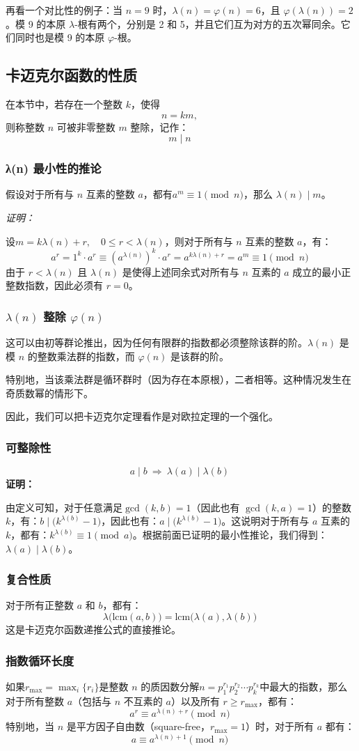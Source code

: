 再看一个对比性的例子：当 $n = 9$ 时，$\lambda(n) = \varphi(n) = 6$，且 $\varphi(\lambda(n)) = 2$。模 9 的本原 $\lambda$-根有两个，分别是 2 和 5，并且它们互为对方的五次幂同余。它们同时也是模 9 的本原 $\varphi$-根。
\subsection{卡迈克尔函数的性质}
在本节中，若存在一个整数 $k$，使得
$$
n = k m,~
$$
则称整数 $n$ 可被非零整数 $m$ 整除，记作：
$$
m \mid n~
$$
\subsubsection{λ(n) 最小性的推论}
假设对于所有与 $n$ 互素的整数 $a$，都有$a^{m} \equiv 1 \pmod{n}$，那么 $\lambda(n) \mid m$。

\textsl{证明：}

设$m = k \lambda(n) + r, \quad 0 \le r < \lambda(n)$，则对于所有与 $n$ 互素的整数 $a$，有：
$$
a^{r} = 1^{k} \cdot a^{r} \equiv \left(a^{\lambda(n)}\right)^{k} \cdot a^{r} = a^{k\lambda(n) + r} = a^{m} \equiv 1 \pmod{n}~
$$
由于 $r < \lambda(n)$ 且 $\lambda(n)$ 是使得上述同余式对所有与 $n$ 互素的 $a$ 成立的最小正整数指数，因此必须有 $r = 0$。
\subsubsection{$\lambda(n)$ 整除 $\varphi(n)$}
这可以由初等群论推出，因为任何有限群的指数都必须整除该群的阶。$\lambda(n)$ 是模 $n$ 的整数乘法群的指数，而 $\varphi(n)$ 是该群的阶。

特别地，当该乘法群是循环群时（因为存在本原根），二者相等。这种情况发生在奇质数幂的情形下。

因此，我们可以把卡迈克尔定理看作是对欧拉定理的一个强化。
\subsubsection{可整除性}
$$
a \mid b \ \Rightarrow \ \lambda(a) \mid \lambda(b)~
$$
\textbf{证明：}

由定义可知，对于任意满足$\gcd(k, b) = 1$（因此也有 $\gcd(k, a) = 1$）的整数 $k$，有：$b \mid \bigl(k^{\lambda(b)} - 1\bigr)$，因此也有：$a \mid \bigl(k^{\lambda(b)} - 1\bigr)$。这说明对于所有与 $a$ 互素的 $k$，都有：$k^{\lambda(b)} \equiv 1 \pmod{a}$。根据前面已证明的最小性推论，我们得到：$
\lambda(a) \mid \lambda(b)$。
\subsubsection{复合性质}
对于所有正整数 $a$ 和 $b$，都有：
$$
\lambda\bigl(\mathrm{lcm}(a, b)\bigr) = \mathrm{lcm}\bigl(\lambda(a), \lambda(b)\bigr)~
$$
这是卡迈克尔函数递推公式的直接推论。
\subsubsection{指数循环长度}
如果$r_{\mathrm{max}} = \max_{i} \{ r_{i} \}$是整数 $n$ 的质因数分解$n = p_{1}^{r_{1}} p_{2}^{r_{2}} \cdots p_{k}^{r_{k}}$中最大的指数，那么对于所有整数 $a$（包括与 $n$ 不互素的 $a$）以及所有 $r \ge r_{\mathrm{max}}$，都有：
$$
a^{r} \equiv a^{\lambda(n) + r} \pmod{n}~
$$
特别地，当 $n$ 是平方因子自由数（square-free，$r_{\mathrm{max}} = 1$）时，对于所有 $a$ 都有：
$$
a \equiv a^{\lambda(n) + 1} \pmod{n}~
$$
